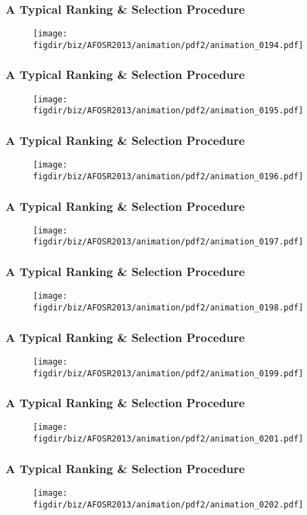 \documentclass[13pt]{beamer}
\newcommand{\figdir}{../../fig}
\begin{document}
\begin{frame}\frametitle{A Typical Ranking \& Selection Procedure}\begin{figure}\texttt{[image: \\figdir/biz/AFOSR2013/animation/pdf2/animation\_0194.pdf]}\end{figure}\end{frame}
\begin{frame}\frametitle{A Typical Ranking \& Selection Procedure}\begin{figure}\texttt{[image: \\figdir/biz/AFOSR2013/animation/pdf2/animation\_0195.pdf]}\end{figure}\end{frame}
\begin{frame}\frametitle{A Typical Ranking \& Selection Procedure}\begin{figure}\texttt{[image: \\figdir/biz/AFOSR2013/animation/pdf2/animation\_0196.pdf]}\end{figure}\end{frame}
\begin{frame}\frametitle{A Typical Ranking \& Selection Procedure}\begin{figure}\texttt{[image: \\figdir/biz/AFOSR2013/animation/pdf2/animation\_0197.pdf]}\end{figure}\end{frame}
\begin{frame}\frametitle{A Typical Ranking \& Selection Procedure}\begin{figure}\texttt{[image: \\figdir/biz/AFOSR2013/animation/pdf2/animation\_0198.pdf]}\end{figure}\end{frame}
\begin{frame}\frametitle{A Typical Ranking \& Selection Procedure}\begin{figure}\texttt{[image: \\figdir/biz/AFOSR2013/animation/pdf2/animation\_0199.pdf]}\end{figure}\end{frame}
\begin{frame}\frametitle{A Typical Ranking \& Selection Procedure}\begin{figure}\texttt{[image: \\figdir/biz/AFOSR2013/animation/pdf2/animation\_0201.pdf]}\end{figure}\end{frame}
\begin{frame}\frametitle{A Typical Ranking \& Selection Procedure}\begin{figure}\texttt{[image: \\figdir/biz/AFOSR2013/animation/pdf2/animation\_0202.pdf]}\end{figure}\end{frame}
\end{document}
